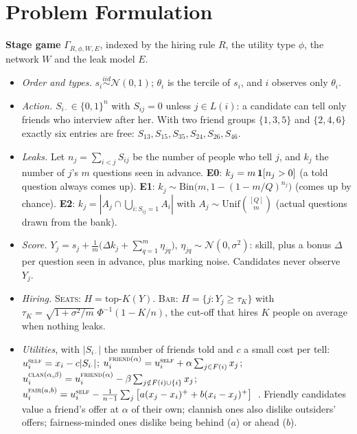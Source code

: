 \documentclass[conference]{IEEEtran}
\theoremstyle{plain}
\theoremstyle{definition}\newtheorem{definition}{Definition}
\newcommand{\seats}{\textsc{Seats}}\newcommand{\barr}{\textsc{Bar}}
\begin{document}
\section{Problem Formulation}
\textbf{Stage game} $\Gamma_{R,\phi,W,E}$, indexed by the hiring rule $R$, the utility type $\phi$, the network $W$ and the leak model $E$.
\begin{itemize}
\item \emph{Order and types.} $s_i\overset{iid}{\sim}\mathcal N(0,1)$; $\theta_i$ is the tercile of $s_i$, and $i$ observes only $\theta_i$.
\item \emph{Action.} $S_{i\cdot}\in\{0,1\}^n$ with $S_{ij}=0$ unless $j\in L(i)$: a candidate can tell only friends who interview after her.
With two friend groups $\{1,3,5\}$ and $\{2,4,6\}$ exactly six entries are free: $S_{13},S_{15},S_{35},S_{24},S_{26},S_{46}$.
\item \emph{Leaks.} Let $n_j=\sum_{i<j}S_{ij}$ be the number of people who tell $j$, and $k_j$ the number of $j$'s $m$ questions seen in advance.
\textbf{E0}: $k_j=m\,\mathbf{1}[n_j>0]$ (a told question always comes up).
\textbf{E1}: $k_j\sim\mathrm{Bin}\big(m,1-(1-m/Q)^{n_j}\big)$ (comes up by chance).
\textbf{E2}: $k_j=|A_j\cap\bigcup_{i:S_{ij}=1}A_i|$ with $A_j\sim\mathrm{Unif}\binom{[Q]}{m}$ (actual questions drawn from the bank).
\item \emph{Score.} $Y_j=s_j+\frac1m\big(\Delta k_j+\sum_{q=1}^m\eta_{jq}\big)$, $\eta_{jq}\sim\mathcal N(0,\sigma^2)$: skill, plus a bonus
$\Delta$ per question seen in advance, plus marking noise. Candidates never observe $Y_j$.
\item \emph{Hiring.} \seats: $H=\text{top-}K(Y)$. \barr: $H=\{j:Y_j\ge\tau_K\}$ with $\tau_K=\sqrt{1+\sigma^2/m}\;\Phi^{-1}(1-K/n)$, the
cut-off that hires $K$ people on average when nothing leaks.
\item \emph{Utilities}, with $|S_{i\cdot}|$ the number of friends told and $c$ a small cost per tell:
$u_i^{\textsc{self}}=x_i-c|S_{i\cdot}|$;\;
$u_i^{\textsc{friend}(\alpha)}=u_i^{\textsc{self}}+\alpha\sum_{j\in F(i)}x_j$;\;
$u_i^{\textsc{clan}(\alpha,\beta)}=u_i^{\textsc{friend}(\alpha)}-\beta\sum_{j\notin F(i)\cup\{i\}}x_j$;\;
$u_i^{\textsc{fair}(a,b)}=u_i^{\textsc{self}}-\frac{1}{n-1}\sum_j\big[a(x_j-x_i)^++b(x_i-x_j)^+\big]$~\cite{fehr}.
Friendly candidates value a friend's offer at $\alpha$ of their own; clannish ones also dislike outsiders' offers; fairness-minded ones dislike being behind ($a$) or ahead ($b$).
\end{itemize}
\end{document}
